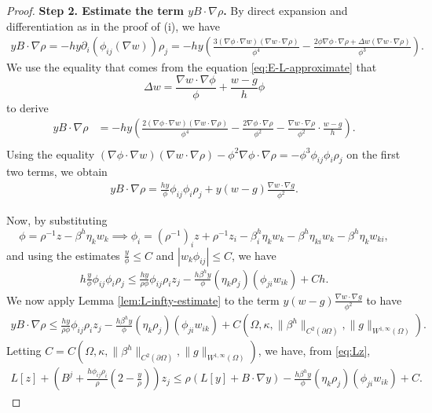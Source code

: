 \documentclass[11pt]{article}
\numberwithin{equation}{section}
\def\le{\leqslant}
\def\leq{\leqslant}
\begin{document}
\begin{proof}
\textbf{Step 2. Estimate the term $yB\cdot\nabla \rho$.} By direct expansion and differentiation as in the proof of (i), we have
\begin{align*}
yB\cdot\nabla \rho = -hy\partial_i(\phi_{ij}(\nabla w))\rho_j = -hy\left(\frac{3 (\nabla \phi \cdot \nabla w) (\nabla w \cdot \nabla \rho)}{\phi^4} - \frac{2 \phi \nabla \phi \cdot \nabla \rho + \Delta w (\nabla w \cdot \nabla \rho)}{\phi^{3}}\right).
\end{align*}
We use the equality that comes from the equation \eqref{eq:E-L-approximate} that
$$
\Delta w = \frac{\nabla w \cdot \nabla \phi}{\phi} + \frac{w - g}{h} \phi
$$
to derive
\begin{align*}
yB\cdot\nabla \rho &= -hy\left(\frac{2 (\nabla \phi \cdot \nabla w) (\nabla w \cdot \nabla \rho)}{\phi^4} - \frac{2\nabla\phi\cdot\nabla\rho}{\phi^2} -\frac{\nabla w\cdot\nabla \rho}{\phi^2}\cdot\frac{w-g}{h}\right).\\
\end{align*}
Using the equality $(\nabla \phi \cdot \nabla w) (\nabla w \cdot \nabla \rho) - \phi^2\nabla\phi\cdot\nabla\rho = -\phi^3\phi_{ij}\phi_i\rho_j$ on the first two terms, we obtain
\begin{align*}
yB\cdot\nabla \rho = \frac{hy}{\phi}\phi_{ij}\phi_i\rho_j + y(w-g)\frac{\nabla w\cdot \nabla g}{\phi^2}.
\end{align*}

Now, by substituting
\[
\phi = \rho^{-1}z - \beta^h \eta_k w_k \implies \phi_i = (\rho^{-1})_iz + \rho^{-1}z_i - \beta^h_i \eta_{k} w_k - \beta^h \eta_{ki} w_k - \beta^h \eta_k w_{ki},
\]
and using the estimates $\frac{y}{\phi}\leq C$ and $|w_k\phi_{ij}|\leq C$, we have
\begin{align*}
h\frac{y}{\phi}\phi_{ij}\phi_i\rho_j \leq \frac{hy}{\rho\phi}\phi_{ij}\rho_iz_j - \frac{h\beta^h y}{\phi}(\eta_k \rho_j) (\phi_{ji} w_{ik}) + Ch.
\end{align*}
We now apply Lemma \ref{lem:L-infty-estimate} to the term $y(w-g)\frac{\nabla w\cdot \nabla g}{\phi^2}$ to have
\begin{align*}
yB\cdot\nabla \rho \leq \frac{hy}{\rho\phi}\phi_{ij}\rho_iz_j - \frac{h\beta^h y}{\phi}(\eta_k \rho_j) (\phi_{ji} w_{ik}) + C(\Omega,\kappa,\|\beta^h\|_{C^2(\partial\Omega)},\|g\|_{W^{1,\infty}(\Omega)}).
\end{align*}
Letting $C=C(\Omega,\kappa,\|\beta^h\|_{C^2(\partial\Omega)},\|g\|_{W^{1,\infty}(\Omega)})$, we have, from \eqref{eq:Lz},
\begin{align}\label{eq:yBrho}
L[z] + \left(B^j + \frac{h\phi_{ij}\rho_i}{\rho}\left(2-\frac{y}{\rho}\right)\right)z_j \le \rho \left(L[y] + B \cdot \nabla y \right) - \frac{h\beta^h y}{\phi}(\eta_k \rho_j) (\phi_{ji} w_{ik}) + C.
\end{align}


\end{proof}
\end{document}
